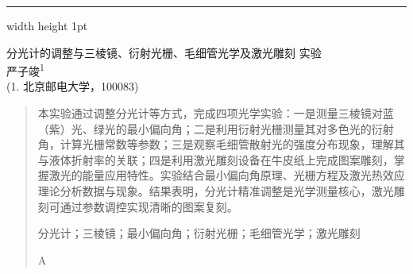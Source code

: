 \documentclass[12pt,a4paper]{article}
\begin{document}

\thispagestyle{firstpage}




\vspace*{-2cm}

\hrule width \textwidth height 1pt

\vspace{1.5cm}



\begin{center}
    {\heiti 分光计的调整与三棱镜、衍射光栅、毛细管光学及激光雕刻
实验} \\[0.5\baselineskip]

    {\kaishu 严子竣\textsuperscript{1}} \\[0.3\baselineskip]

    {\kaishu (1. 北京邮电大学，100083)} \\[0.5\baselineskip]
\end{center}




\begin{quote}

    \songti

    \setlength{\leftskip}{2em}

    \setlength{\rightskip}{2em}



     本实验通过调整分光计等方式，完成四项光学实验：一是测量三棱镜对蓝（紫）光、绿光的最小偏向角；二是利用衍射光栅测量其对多色光的衍射角，计算光栅常数等参数；三是观察毛细管散射光的强度分布现象，理解其与液体折射率的关联；四是利用激光雕刻设备在牛皮纸上完成图案雕刻，掌握激光的能量应用特性。实验结合最小偏向角原理、光栅方程及激光热效应理论分析数据与现象。结果表明，分光计精准调整是光学测量核心，激光雕刻可通过参数调控实现清晰的图案复刻。



    \vspace{0.5\baselineskip}

     分光计；三棱镜；最小偏向角；衍射光栅；毛细管光学；激光雕刻



    A

\end{quote}
\end{document}
